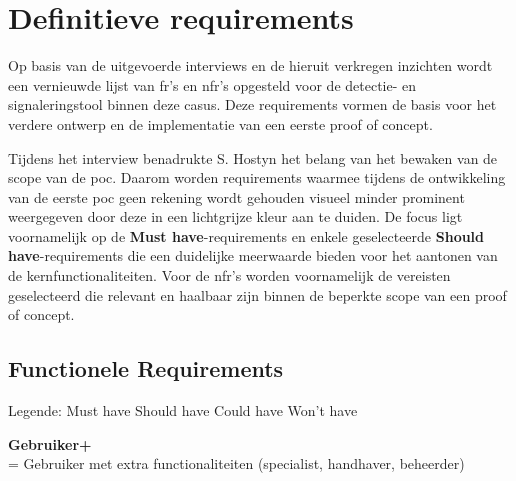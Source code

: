 \section{Definitieve requirements}
\label{sec:requirements}

Op basis van de uitgevoerde interviews en de hieruit verkregen inzichten wordt een vernieuwde lijst van \acrshort{fr}'s en \acrshort{nfr}'s opgesteld voor de detectie- en signaleringstool binnen deze casus. Deze requirements vormen de basis voor het verdere ontwerp en de implementatie van een eerste proof of concept.

\vspace{1em}

Tijdens het interview benadrukte S. Hostyn het belang van het bewaken van de scope van de \acrshort{poc}. Daarom worden requirements waarmee tijdens de ontwikkeling van de eerste \acrshort{poc} geen rekening wordt gehouden visueel minder prominent weergegeven door deze in een lichtgrijze kleur aan te duiden. De focus ligt voornamelijk op de \textbf{Must have}-requirements en enkele geselecteerde \textbf{Should have}-requirements die een duidelijke meerwaarde bieden voor het aantonen van de kernfunctionaliteiten. Voor de \acrshort{nfr}'s worden voornamelijk de vereisten geselecteerd die relevant en haalbaar zijn binnen de beperkte scope van een proof of concept.

\vspace{1em}

\subsection{Functionele Requirements}

\vspace{1em}

Legende: \enspace \textcolor{red}{\textbf{\bol}} Must have 
\enspace \textcolor{orange}{\textbf{\bol}} Should have 
\enspace \textcolor{ForestGreen}{\textbf{\bol}} Could have 
\enspace \textcolor{gray}{\textbf{\bol}} Won't have

\vspace{1em}

\textbf{Gebruiker+} \\ 
= Gebruiker met extra functionaliteiten (specialist, handhaver, beheerder)

\vspace{1em}

